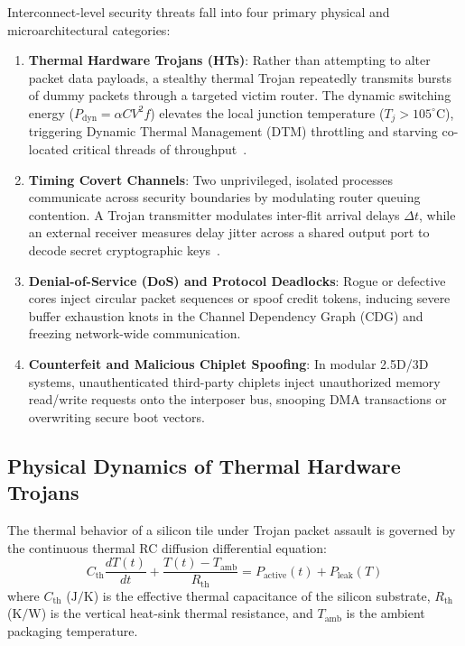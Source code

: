 Interconnect-level security threats fall into four primary physical and microarchitectural categories:

\begin{enumerate}
    \item \textbf{Thermal Hardware Trojans (HTs)}: Rather than attempting to alter packet data payloads, a stealthy thermal Trojan repeatedly transmits bursts of dummy packets through a targeted victim router. The dynamic switching energy ($P_{\mathrm{dyn}} = \alpha C V^2 f$) elevates the local junction temperature ($T_j > 105^\circ\mathrm{C}$), triggering Dynamic Thermal Management (DTM) throttling and starving co-located critical threads of throughput~\cite{Hasanzadeh2026Heat}.
    
    \item \textbf{Timing Covert Channels}: Two unprivileged, isolated processes communicate across security boundaries by modulating router queuing contention. A Trojan transmitter modulates inter-flit arrival delays $\Delta t$, while an external receiver measures delay jitter across a shared output port to decode secret cryptographic keys~\cite{Jaster2025Trust}.
    
    \item \textbf{Denial-of-Service (DoS) and Protocol Deadlocks}: Rogue or defective cores inject circular packet sequences or spoof credit tokens, inducing severe buffer exhaustion knots in the Channel Dependency Graph (CDG) and freezing network-wide communication.

    \item \textbf{Counterfeit and Malicious Chiplet Spoofing}: In modular 2.5D/3D systems, unauthenticated third-party chiplets inject unauthorized memory read/write requests onto the interposer bus, snooping DMA transactions or overwriting secure boot vectors.
\end{enumerate}

\subsection{Physical Dynamics of Thermal Hardware Trojans}
The thermal behavior of a silicon tile under Trojan packet assault is governed by the continuous thermal RC diffusion differential equation:
\begin{equation}
C_{\mathrm{th}} \frac{dT(t)}{dt} + \frac{T(t) - T_{\mathrm{amb}}}{R_{\mathrm{th}}} = P_{\mathrm{active}}(t) + P_{\mathrm{leak}}(T)
\label{eq:thermal-rc-diffusion}
\end{equation}
where $C_{\mathrm{th}}$ ($\mathrm{J/K}$) is the effective thermal capacitance of the silicon substrate, $R_{\mathrm{th}}$ ($\mathrm{K/W}$) is the vertical heat-sink thermal resistance, and $T_{\mathrm{amb}}$ is the ambient packaging temperature.

